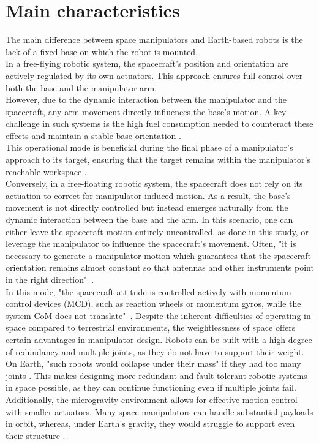 \documentclass[a4paper,12pt,oneside]{report}
\begin{document}
\section{Main characteristics}
The main difference between space manipulators and Earth-based robots is the lack of a fixed base on which the robot is mounted.\\
In a free-flying robotic system, the spacecraft’s position and orientation are actively regulated by its own actuators. This approach ensures full control over both the base and the manipulator arm.\\
However, due to the dynamic interaction between the manipulator and the spacecraft, any arm movement directly influences the base’s motion. A key challenge in such systems is the high fuel consumption needed to counteract these effects and maintain a stable base orientation \cite{six}.\\
This operational mode is beneficial during the final phase of a manipulator’s approach to its target, ensuring that the target remains within the manipulator’s reachable workspace \cite{two}.\\
Conversely, in a free-floating robotic system, the spacecraft does not rely on its actuation to correct for manipulator-induced motion. As a result, the base’s movement is not directly controlled but instead emerges naturally from the dynamic interaction between the base and the arm. In this scenario, one can either leave the spacecraft motion entirely uncontrolled, as done in this study, or leverage the manipulator to influence the spacecraft’s movement. Often, "it is necessary to generate a manipulator motion which guarantees that the spacecraft orientation remains almost constant so that antennas and other instruments point in the right direction"~\cite{six}.\\
In this mode, "the spacecraft attitude is controlled actively with momentum control devices (MCD), such as reaction wheels or momentum gyros, while the system CoM does not translate"~\cite{two}.
Despite the inherent difficulties of operating in space compared to terrestrial environments, the weightlessness of space offers certain advantages in manipulator design. Robots can be built with a high degree of redundancy and multiple joints, as they do not have to support their weight. On Earth, "such robots would collapse under their mass" if they had too many joints \cite{six}. This makes designing more redundant and fault-tolerant robotic systems in space possible, as they can continue functioning even if multiple joints fail. Additionally, the microgravity environment allows for effective motion control with smaller actuators. Many space manipulators can handle substantial payloads in orbit, whereas, under Earth’s gravity, they would struggle to support even their structure \cite{six}.\\
\end{document}

